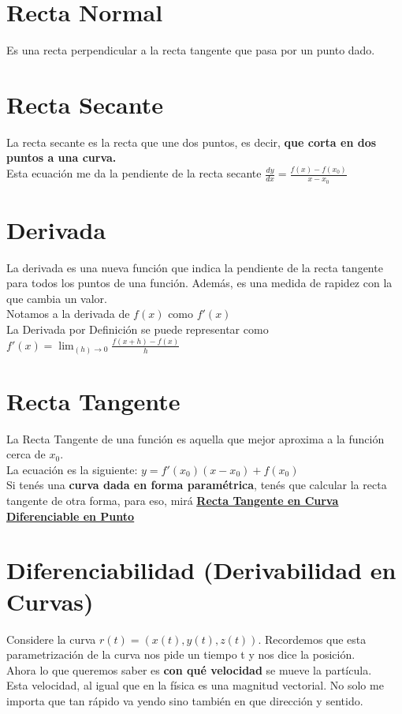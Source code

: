 \documentclass[10pt,a4paper]{article}
\begin{document}
\section*{Recta Normal}
Es una recta perpendicular a la recta tangente que pasa por un punto dado. 
\section*{Recta Secante}
La recta secante es la recta que une dos puntos, es decir, \textbf{que corta en dos puntos a una curva.} \\
Esta ecuación me da la pendiente de la recta secante $ \frac{dy}{dx} = \frac{f(x)-f(x_{0})}{x-x_{0}}$
\section*{Derivada}
La derivada es una nueva función que indica la pendiente de la recta tangente para todos los puntos de una función. Además, es una medida de rapidez con la que cambia un valor. \\
Notamos a la derivada de $f(x)$ como $f'(x)$ \\
La Derivada por Definición se puede representar como $f'(x) = \lim_{(h) \to 0} \frac{f(x+h)-f(x)}{h}$
\section*{Recta Tangente}
La Recta Tangente de una función es aquella que mejor aproxima a la función cerca de $x_{0}$. \\
La ecuación es la siguiente: $ y = f'(x_{0})(x-x_{0})+f(x_{0})$ \\
Si tenés una \textbf{curva dada en forma paramétrica}, tenés que calcular la recta tangente de otra forma, para eso, mirá \hyperref[subsec:recta_tangente_curva]{\underline{\textbf{Recta Tangente en Curva Diferenciable en Punto}}}
\section*{Diferenciabilidad (Derivabilidad en Curvas)}
Considere la curva $r(t) = (x(t), y(t), z(t))$. Recordemos que esta parametrización de la curva nos pide un tiempo t y nos dice la posición. \\
Ahora lo que queremos saber es \textbf{con qué velocidad} se mueve la partícula. \\
Esta velocidad, al igual que en la física es una magnitud vectorial. No solo me importa que tan rápido va yendo sino también en que dirección y sentido.
\end{document}
